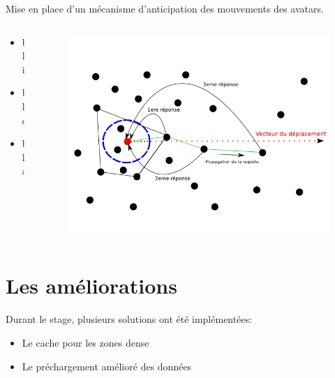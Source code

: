 \documentclass{beamer}
\begin{document}
  \begin{frame}
	Mise en place d'un mécanisme d'anticipation des mouvements des avatars.
	\begin{columns}
	  \begin{column}{5cm}
		\begin{itemize}
		  \item bli
		  \item blo
		  \item bla
		\end{itemize}
	  \end{column}
	\begin{column}{5cm}
	\begin{figure}
        \includegraphics[scale=0.3]{./Ressources/Images/propagation_algo.png}\\
        \label{Propa_Algo}
        \end{figure}
	\end{column}
	\end{columns}

  \end{frame}

  \section{Les améliorations}
  \begin{frame}
	Durant le stage, plusieurs solutions ont été implémentées:
	\begin{itemize}
		\pause\item Le cache pour les zones dense
		\pause\item Le préchargement amélioré des données
	\end{itemize}
  \end{frame}
\end{document}
